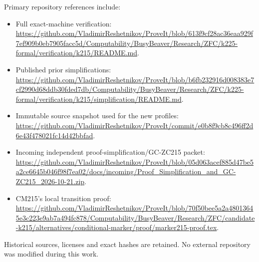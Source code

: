 \documentclass[11pt]{article}
\begin{document}
Primary repository references include:
\begin{itemize}
\item Full exact-machine verification: \url{https://github.com/VladimirReshetnikov/ProveIt/blob/613f9cf28ac36eaa929f7ef909b0eb7905facc5d/Computability/BusyBeaver/Research/ZFC/k225-formal/verification/k215/README.md}.
\item Published prior simplifications: \url{https://github.com/VladimirReshetnikov/ProveIt/blob/b6fb232916d008383e7cf2990d68ddb30fded7db/Computability/BusyBeaver/Research/ZFC/k225-formal/verification/k215/simplification/README.md}.
\item Immutable source snapshot used for the new profiles: \url{https://github.com/VladimirReshetnikov/ProveIt/commit/e0b8f9cb8c496ff2d6e43f478021fc14d42bbfad}.
\item Incoming independent proof-simplification/GC-ZC215 packet: \url{https://github.com/VladimirReshetnikov/ProveIt/blob/05d063acef885d47be5a2ce6645b046f98f7ea02/docs/incoming/Proof_Simplification_and_GC-ZC215_2026-10-21.zip}.
\item CM215's local transition proof: \url{https://github.com/VladimirReshetnikov/ProveIt/blob/70f50bee5a2a48013645e3c223e9ab7a494fc878/Computability/BusyBeaver/Research/ZFC/candidate-k215/alternatives/conditional-marker/proof/marker215-proof.tex}.
\end{itemize}
Historical sources, licenses and exact hashes are retained. No external repository was modified during this work.
\end{document}

